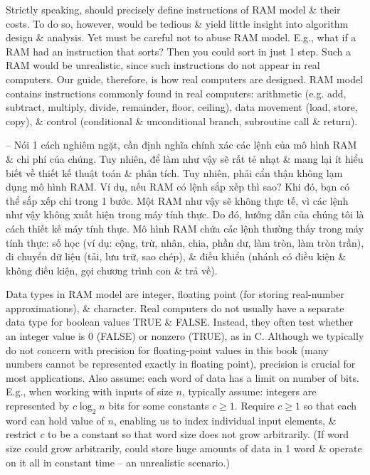 \documentclass{article}
\begin{document}
\begin{itemize}
\begin{itemize}
\begin{itemize}
            Strictly speaking, should precisely define instructions of RAM model \& their costs. To do so, however, would be tedious \& yield little insight into algorithm design \& analysis. Yet must be careful not to abuse RAM model. E.g., what if a RAM had an instruction that sorts? Then you could sort in just 1 step. Such a RAM would be unrealistic, since such instructions do not appear in real computers. Our guide, therefore, is how real computers are designed. RAM model contains instructions commonly found in real computers: arithmetic (e.g. add, subtract, multiply, divide, remainder, floor, ceiling), data movement (load, store, copy), \& control (conditional \& unconditional branch, subroutine call \& return).
            
            -- Nói 1 cách nghiêm ngặt, cần định nghĩa chính xác các lệnh của mô hình RAM \& chi phí của chúng. Tuy nhiên, để làm như vậy sẽ rất tẻ nhạt \& mang lại ít hiểu biết về thiết kế thuật toán \& phân tích. Tuy nhiên, phải cẩn thận không lạm dụng mô hình RAM. Ví dụ, nếu RAM có lệnh sắp xếp thì sao? Khi đó, bạn có thể sắp xếp chỉ trong 1 bước. Một RAM như vậy sẽ không thực tế, vì các lệnh như vậy không xuất hiện trong máy tính thực. Do đó, hướng dẫn của chúng tôi là cách thiết kế máy tính thực. Mô hình RAM chứa các lệnh thường thấy trong máy tính thực: số học (ví dụ: cộng, trừ, nhân, chia, phần dư, làm tròn, làm tròn trần), di chuyển dữ liệu (tải, lưu trữ, sao chép), \& điều khiển (nhánh có điều kiện \& không điều kiện, gọi chương trình con \& trả về).
            
            Data types in RAM model are integer, floating point (for storing real-number approximations), \& character. Real computers do not usually have a separate data type for boolean values TRUE \& FALSE. Instead, they often test whether an integer value is 0 (FALSE) or nonzero (TRUE), as in C. Although we typically do not concern with precision for floating-point values in this book (many numbers cannot be represented exactly in floating point), precision is crucial for most applications. Also assume: each word of data has a limit on number of bits. E.g., when working with inputs of size $n$, typically assume: integers are represented by $c\log_2n$ bits for some constants $c\ge1$. Require $c\ge1$ so that each word can hold value of $n$, enabling us to index individual input elements, \& restrict $c$ to be a constant so that word size does not grow arbitrarily. (If word size could grow arbitrarily, could store huge amounts of data in 1 word \& operate on it all in constant time -- an unrealistic scenario.)
            

\end{itemize}
\end{itemize}
\end{itemize}
\end{document}
